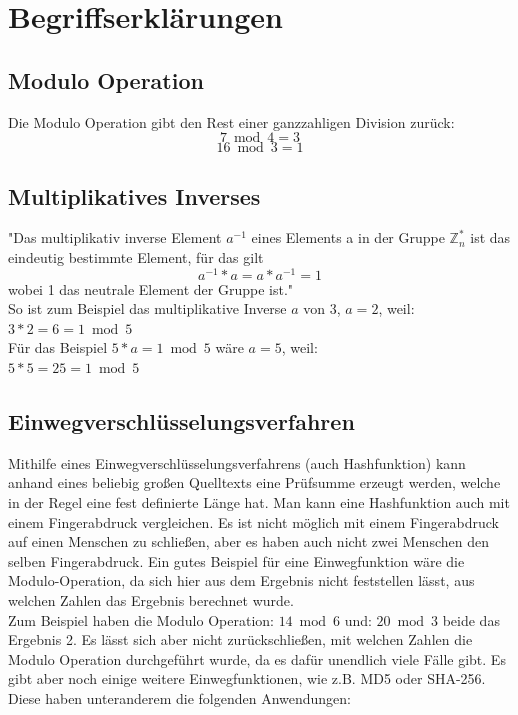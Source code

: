 \documentclass[12pt,a4paper]{scrartcl}
\begin{document}

\pagebreak


\section{Begriffserklärungen}
	\subsection{Modulo Operation} %
	Die Modulo Operation gibt den Rest einer ganzzahligen Division zurück:
	$$ {7 \bmod 4 = 3} $$
	$$ {16 \bmod 3 = 1} $$
	
	\subsection{Multiplikatives Inverses}
	"Das multiplikativ inverse Element $a^{-1}$ eines Elements a in der Gruppe $\mathbb{Z}_n ^*$ ist das eindeutig bestimmte Element, für das gilt $${a^{-1} * a  =  a * a^{-1}  =  1}$$ wobei 1 das neutrale Element der Gruppe ist." \cite{hwlang} \\
	
	So ist zum Beispiel das multiplikative Inverse $a$ von 3, $a=2$, weil: \\
	${3 * 2 = 6 = 1 \bmod 5}$ \\
	
	Für das Beispiel ${5 * a = 1 \bmod 5}$ wäre $a=5$, weil: \\
	${5 * 5 = 25 = 1 \bmod 5}$ \\
	
	\subsection{Einwegverschlüsselungsverfahren}
	Mithilfe eines Einwegverschlüsselungsverfahrens (auch Hashfunktion) kann anhand eines beliebig großen Quelltexts eine Prüfsumme erzeugt werden, welche in der Regel eine fest definierte Länge hat. Man kann eine Hashfunktion auch mit einem Fingerabdruck vergleichen. Es ist nicht möglich mit einem Fingerabdruck auf einen Menschen zu schließen, aber es haben auch nicht zwei Menschen den selben Fingerabdruck.\cite[S.11]{Beutelspacher2015-jl} Ein gutes Beispiel für eine Einwegfunktion wäre die Modulo-Operation, da sich hier aus dem Ergebnis nicht feststellen lässt, aus welchen Zahlen das Ergebnis berechnet wurde. \\
	Zum Beispiel haben die Modulo Operation: ${14 \bmod 6}$  und: ${20 \bmod 3}$ beide das Ergebnis 2. Es lässt sich aber nicht zurückschließen, mit welchen Zahlen die Modulo Operation durchgeführt wurde, da es dafür unendlich viele Fälle gibt. Es gibt aber noch einige weitere Einwegfunktionen, wie z.B. MD5 oder SHA-256.\cite[S.11]{Beutelspacher2015-jl} Diese haben unteranderem die folgenden Anwendungen:
	
\end{document}
